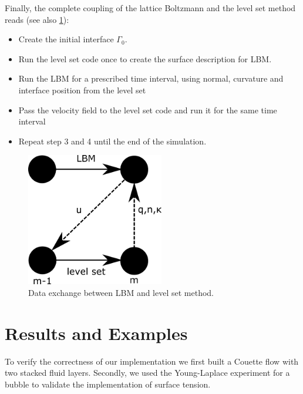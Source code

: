\documentclass[final,leqno,onefignum,onetabnum]{siamltexmm}
\begin{document}
Finally, the complete coupling of the lattice Boltzmann and the level set method reads (see also \cref{dataexchange}):
\begin{itemize}
	\item[1.] Create the initial interface $\Gamma_0$.
	\item[2.] Run the level set code once to create the surface description for LBM.
	\item[3.] Run the LBM  for a prescribed time interval, using normal, curvature and interface position from the level set
	\item[4.] Pass the velocity field to the level set code and run it for the same time interval
	\item[5.] Repeat step 3 and 4 until the end of the simulation.
\end{itemize}
\begin{figure}[h!]
	\hfill\includegraphics[trim = 0mm 0cm 0mm 4cm, clip, width=6cm,natwidth=632,natheight=562]{dataexchange.png}\hspace*{\fill}
	\caption{Data exchange between LBM and level set method.}
	\label{dataexchange}
\end{figure}

\newpage
\section{Results and Examples}
To verify the correctness of our implementation we first built a Couette flow with two stacked fluid layers. Secondly, we used the Young-Laplace experiment for a bubble to validate the implementation of surface tension.
\end{document}
